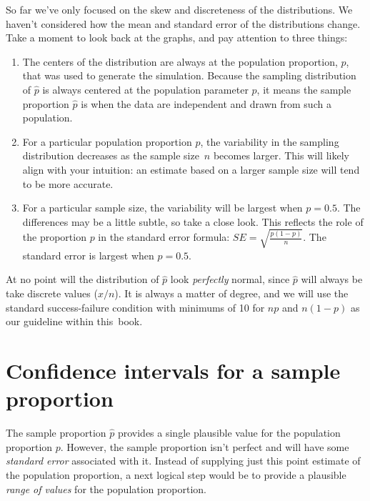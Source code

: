 So far we've only focused on the skew and discreteness
of the distributions.
We haven't considered how the mean and standard error
of the distributions change.
Take a moment to look back at the graphs,
and pay attention to three things:
\begin{enumerate}
\item The centers of the distribution are always at
    the population proportion, $p$, that was used to
    generate the simulation. Because the sampling
    distribution of $\hat{p}$ is always centered at
    the population parameter $p$, it means the sample
    proportion $\hat{p}$ is  when
    the data are independent and drawn from such
    a population.
\item For a particular population proportion $p$,
    the variability in the sampling distribution
    decreases as the sample size~$n$ becomes larger.
    This will likely align with your intuition:
    an estimate based on a larger sample size will
    tend to be more accurate.
\item For a particular sample size, the variability
    will be largest when $p = 0.5$. The differences
    may be a little subtle, so take a close look.
    This reflects the role of the proportion
    $p$ in the standard error formula:
    $SE = \sqrt{\frac{p (1 - p)}{n}}$.
    The standard error is largest when $p = 0.5$.
\end{enumerate}

At no point will the distribution of $\hat{p}$ look
\emph{perfectly} normal, since $\hat{p}$ will always
be take discrete values ($x / n$).
It is always a matter of degree, and we will use
the standard success-failure condition with minimums
of 10 for $np$ and $n (1 - p)$ as our guideline
within this~book.




\section{Confidence intervals for a sample proportion}
\label{confidenceIntervals}


The sample proportion $\hat{p}$ provides a single plausible value
for the population proportion $p$. However, the sample proportion
isn't perfect and will have some \emph{standard error}
associated with it. Instead of supplying just this point estimate
of the population proportion, a next logical step would be
to provide a plausible \emph{range of values} for the population
proportion.

